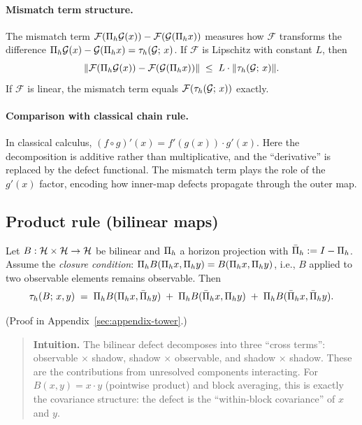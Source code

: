 \paragraph{Mismatch term structure.}
The mismatch term $\mathcal{F}(\Pi_{h} \mathcal{G}(x)) - \mathcal{F}(\mathcal{G}(\Pi_{h} x))$ measures how $\mathcal{F}$ transforms the difference $\Pi_{h} \mathcal{G}(x) - \mathcal{G}(\Pi_{h} x) = \tau_{h}(\mathcal{G};\, x)$.
If $\mathcal{F}$ is Lipschitz with constant $L$, then
\[
\|\mathcal{F}(\Pi_{h} \mathcal{G}(x)) - \mathcal{F}(\mathcal{G}(\Pi_{h} x))\| \;\le\; L \cdot \|\tau_{h}(\mathcal{G};\, x)\|.
\]
If $\mathcal{F}$ is linear, the mismatch term equals $\mathcal{F}(\tau_{h}(\mathcal{G};\, x))$ exactly.

\paragraph{Comparison with classical chain rule.}
In classical calculus, $(f \circ g)'(x) = f'(g(x)) \cdot g'(x)$.
Here the decomposition is additive rather than multiplicative, and the ``derivative'' is replaced by the defect functional.
The mismatch term plays the role of the $g'(x)$ factor, encoding how inner-map defects propagate through the outer map.

\subsection{Product rule (bilinear maps)}

\begin{proposition}
\label{prop:product-rule}
Let $B:\mathcal{H} \times \mathcal{H} \to \mathcal{H}$ be bilinear and $\Pi_{h}$ a horizon projection with $\bar{\Pi}_{h} := I - \Pi_{h}$.
Assume the \emph{closure condition}: $\Pi_{h} B(\Pi_{h} x, \Pi_{h} y) = B(\Pi_{h} x, \Pi_{h} y)$, i.e., $B$ applied to two observable elements remains observable.
Then
\[
\tau_{h}(B;\, x, y)
\;=\;
\Pi_{h} B(\Pi_{h} x, \bar{\Pi}_{h} y)
\;+\;
\Pi_{h} B(\bar{\Pi}_{h} x, \Pi_{h} y)
\;+\;
\Pi_{h} B(\bar{\Pi}_{h} x, \bar{\Pi}_{h} y).
\]
\end{proposition}

(Proof in Appendix~\ref{sec:appendix-tower}.)

\begin{quote}\small
\textbf{Intuition.} The bilinear defect decomposes into three ``cross terms'':
observable $\times$ shadow, shadow $\times$ observable, and shadow $\times$ shadow.
These are the contributions from unresolved components interacting.
For $B(x,y) = x \cdot y$ (pointwise product) and block averaging, this is exactly the covariance structure: the defect is the ``within-block covariance'' of $x$ and $y$.
\end{quote}

